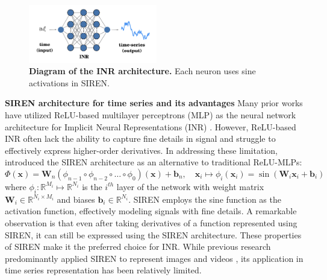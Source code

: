 \documentclass{article}
\begin{document}
\begin{figure}[htb]
  \centering
  \includegraphics[width=0.5\textwidth]{INR.png}
  \caption{\textbf{Diagram of the INR architecture.} Each neuron uses sine activations in SIREN.}
  \label{INR}
\end{figure}

\textbf{SIREN architecture for time series and its advantages}
Many prior works have utilized ReLU-based multilayer perceptrons (MLP) as the neural network architecture for Implicit Neural Representations (INR) \cite{genova2019learning,park2019deepsdf}. 
However, ReLU-based INR often lack the ability to capture fine details in signal and struggle to effectively express higher-order derivatives.
In addressing these limitation, \cite{sitzmann2020implicit} introduced the SIREN architecture as an alternative to traditional ReLU-MLPs:
$$
\Phi(\mathbf{x})=\mathbf{W}_n\left(\phi_{n-1} \circ \phi_{n-2} \circ \ldots \circ \phi_0\right)(\mathbf{x})+\mathbf{b}_n, \quad \mathbf{x}_i \mapsto \phi_i\left(\mathbf{x}_i\right)=\sin \left(\mathbf{W}_i \mathbf{x}_i+\mathbf{b}_i\right)
$$
where $\phi_i: \mathbb{R}^{M_i} \mapsto \mathbb{R}^{N_i}$ is the $i^{t h}$ layer of the network with weight matrix $\mathbf{W}_i \in \mathbb{R}^{N_i \times M_i}$ and biases $\mathbf{b}_i \in \mathbb{R}^{N_i}$.
SIREN employs the sine function as the activation function, effectively modeling signals with fine details.
A remarkable observation is that even after taking derivatives of a function represented using SIREN, 
it can still be expressed using the SIREN architecture. 
These properties of SIREN make it the preferred choice for INR.
While previous research predominantly applied SIREN to represent images and videos \cite{lee2021meta}, its application in time series representation has been relatively limited.
\end{document}
